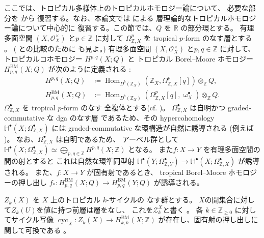 \documentclass[a4paper,dvipdfmx,reqno,12pt]{amsart}
\theoremstyle{definition}
\newcommand{\deq}{\coloneqq}
\newcommand{\opn}[1]{\operatorname{#1}}
\numberwithin{equation}{section}
\begin{document}
ここでは、トロピカル多様体上のトロピカルホモロジー論について、
必要な部分を \cite{MR3330789,MR3894860,MR4637248} から
復習する。なお、本論文では \cite{MR4637248} による
層理論的なトロピカルホモロジー論について中心的に
復習する。この節では、$Q$ を $\mathbb{R}$
の部分環とする。
有理多面空間 $(X,\mathcal{O}_X^{\times})$
と$p\in \mathbb{Z}$ に対して
$\Omega_{\mathbb{Z},X}^{p}$ を
tropical $p$-form のなす層とする
\cite[Definition 2.7]{MR4246795}。
(\cite{MR3330789,MR3961331} との比較のために 
\cite[Remark 2.8]{MR4637248} も見よ。)
有理多面空間 $(X,\mathcal{O}_X^{\times})$
と$p,q\in \mathbb{Z}$ に対して、
トロピカルコホモロジー $H^{p,q}(X;Q)$ と
トロピカル Borel--Moore ホモロジー
$H_{p,q}^{\mathrm{BM}}(X;Q)$ が次のように定義される
\cite[Definition 4.3]{MR4637248}:
\begin{align}
H^{p,q}(X;Q)&\deq \opn{Hom}_{D^{b}(\mathbb{Z}_X)}(
\mathbb{Z}_X,\Omega_{\mathbb{Z},X}^{p}[q])
\otimes_{\mathbb{Z}} Q, \\
H_{p,q}^{\mathrm{BM}}(X;Q)
&\deq \opn{Hom}_{D^{b}(\mathbb{Z}_X)}
(\Omega_{\mathbb{Z},X}^{p}[q],\upomega_{X}^{\bullet})
\otimes_{\mathbb{Z}}Q.
\end{align}
$\Omega_{\mathbb{Z},X}^{\bullet}$ 
を tropical $p$-form のなす
全複体とする(cf. \cite[Proposition 3.1]{smacka2017differential})。
$\Omega_{\mathbb{Z},X}^{\bullet}$ は自明かつ
graded-commutative な dga のなす層
であるため、その hypercohomology 
$\mathbb{H}^{\bullet}(X;\Omega_{\mathbb{Z},X}^{\bullet})$
には
graded-commutative な環構造が自然に誘導される
(例えば \cite[Remark 21.130]{gortzwedhorn2023})。 
なお、$\Omega_{\mathbb{Z},X}^{\bullet}$ は自明であるため、
アーベル群として
$\mathbb{H}^{\bullet}(X;\Omega_{\mathbb{Z},X}^{\bullet})
\simeq \bigoplus_{p,q\in \mathbb{Z}}
H^{p,q}(X;\mathbb{Z})$ となる。
また$f\colon X\to Y$ を有理多面空間の間の射とすると
これは自然な環準同型射 
$\mathbb{H}^{\bullet}(Y;\Omega_{\mathbb{Z},Y}^{\bullet})
\to \mathbb{H}^{\bullet}(X;\Omega_{\mathbb{Z},X}^{\bullet})$
が誘導される\cite[Proposition 4.18]{MR4637248}。
また、$f\colon X\to Y$ が固有射であるとき、
tropical Borel--Moore ホモロジーの押し出し
$f_*\colon H^{\opn{BM}}_{p,q}(X;Q)\to 
H^{\opn{BM}}_{p,q}(Y;Q)$ が誘導される。

$Z_k(X)$ を $X$ 上のトロピカル $k$-サイクルの
なす群とする\cite[Definition 3.5]{MR4637248}。
$X$の開集合に対して$Z_k(U)$を値に持つ前層は層をなし、
これを$\mathscr{Z}_k^{X}$と書く
\cite[p.591]{MR4637248}。
各 $k\in \mathbb{Z}_{\geq 0}$ に対してサイクル写像
$\opn{cyc}_X \colon Z_k(X)\to 
H^{\mathrm{BM}}_{k,k}(X;\mathbb{Z})$
が存在し、固有射の押し出しに関して可換である
\cite[Definition 5.4 and Corollary 5.8]{MR4637248}。
\end{document}
